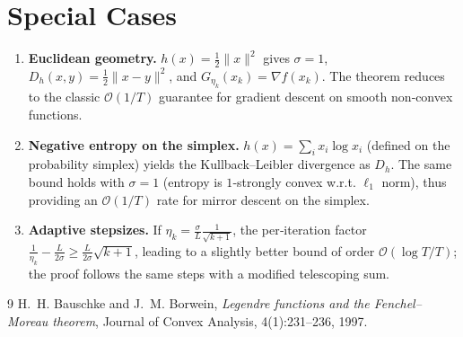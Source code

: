 \documentclass[11pt]{article}
\begin{document}
\section*{Special Cases}
\begin{enumerate}[leftmargin=*]
\item \textbf{Euclidean geometry.} $h(x)=\tfrac12\|x\|^{2}$ gives $\sigma=1$, $D_{h}(x,y)=\tfrac12\|x-y\|^{2}$, and $G_{\eta_{k}}(x_{k})=\nabla f(x_{k})$. The theorem reduces to the classic $\mathcal{O}(1/T)$ guarantee for gradient descent on smooth non‑convex functions.
\item \textbf{Negative entropy on the simplex.} $h(x)=\sum_{i}x_{i}\log x_{i}$ (defined on the probability simplex) yields the Kullback–Leibler divergence as $D_{h}$. The same bound holds with $\sigma=1$ (entropy is $1$‑strongly convex w.r.t. $\ell_{1}$ norm), thus providing an $\mathcal{O}(1/T)$ rate for mirror descent on the simplex.
\item \textbf{Adaptive stepsizes.} If $\eta_{k}=\frac{\sigma}{L}\frac{1}{\sqrt{k+1}}$, the per‑iteration factor $\frac{1}{\eta_{k}}-\frac{L}{2\sigma}\ge\frac{L}{2\sigma}\sqrt{k+1}$, leading to a slightly better bound of order $\mathcal{O}(\log T/T)$; the proof follows the same steps with a modified telescoping sum.
\end{enumerate}

\begin{thebibliography}{9}
H.~H. Bauschke and J.~M. Borwein, \emph{Legendre functions and the
  {F}enchel–{M}oreau theorem}, Journal of Convex Analysis, 4(1):231--236, 1997.
\end{thebibliography}
\end{document}
